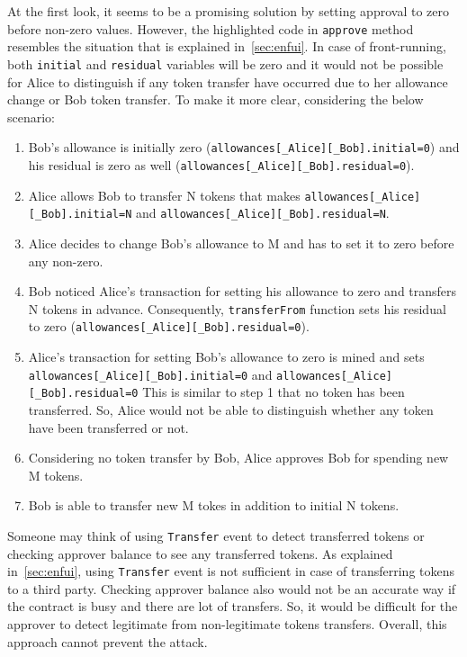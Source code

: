 \noindent At the first look, it seems to be a promising solution by setting approval to zero before non-zero values. However, the highlighted code in \texttt{approve} method resembles the situation that is explained in~\ref{sec:enfui}. In case of front-running, both \texttt{initial} and \texttt{residual} variables will be zero and it would not be possible for Alice to distinguish if any token transfer have occurred due to her allowance change or Bob token transfer. To make it more clear, considering the below scenario:  
\begin{enumerate}
	\item Bob’s allowance is initially zero (\texttt{allowances[\_Alice][\_Bob].initial=0}) and his residual is zero as well (\texttt{allowances[\_Alice][\_Bob].residual=0}).
	\item Alice allows Bob to transfer N tokens that makes \texttt{allowances[\_Alice][\_Bob].initial=N} and \texttt{allowances[\_Alice][\_Bob].residual=N}.
	\item Alice decides to change Bob’s allowance to M and has to set it to zero before any non-zero.
	\item Bob noticed Alice’s transaction for setting his allowance to zero and transfers N tokens in advance. Consequently, \texttt{transferFrom} function sets his residual to zero (\texttt{allowances[\_Alice][\_Bob].residual=0}).
	\item Alice’s transaction for setting Bob's allowance to zero is mined and sets \texttt{allowances[\_Alice][\_Bob].initial=0} and \texttt{allowances[\_Alice][\_Bob].residual=0} This is similar to step 1 that no token has been transferred. So, Alice would not be able to distinguish whether any token have been transferred or not.
	\item Considering no token transfer by Bob, Alice approves Bob for spending new M tokens.
	\item Bob is able to transfer new M tokes in addition to initial N tokens.\newline
\end{enumerate}
Someone may think of using \texttt{Transfer} event to detect transferred tokens or checking approver balance to see any transferred tokens. As explained in~\ref{sec:enfui}, using \texttt{Transfer} event is not sufficient in case of transferring tokens to a third party. Checking approver balance also would not be an accurate way if the contract is busy and there are lot of transfers. So, it would be difficult for the approver to detect legitimate from non-legitimate tokens transfers. Overall, this approach cannot prevent the attack.



